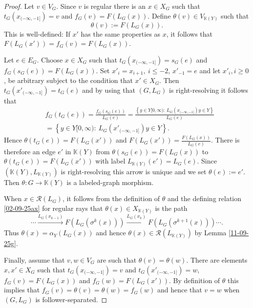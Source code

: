 \documentclass[10pt,a4paper]{amsart}
\begin{document}
\begin{proof} Let $v \in V_G$. Since $v$ is regular there is an $x \in X_G$ such that $t_G(x_{(-\infty,-1]}) = v$ and 
$f_G(v)  = F(L_G(x))$.
Define $\theta(v) \in V_{\mathbb K(Y)}$ such that 
$$
\theta(v) := F(L_G(x)) .
$$
This is well-defined: If $x'$ has the same properties as $x$, it follows that
$F(L_G(x')) = f_G(v) = F(L_G(x))$.


Let $e \in E_G$. Choose $x \in X_G$ such that $t_G(x_{(-\infty,-1]}) = s_G(e)$ and 
$f_G(s_G(e)) = F(L_G(x))$.
Set $x'_i = x_{i+1}, \ i \leq -2$, $x'_{-1} =e$ and let $x'_i, i \geq 0$, be arbitrary subject to the condition that $x' \in X_G$. Then $t_G(x'_{(-\infty, -1]}) = t_G(e)$ and by using that $(G,L_G)$ is right-resolving it follows that
\begin{align*}
& f_G(t_G(e)) = \frac{f_G(s_G(e))}{L_G(e)}
 = \frac{\left\{y \in Y[0,\infty): \ L_G(x_{(-\infty,-1]})y \in Y \right\}}{L_G(e)} \\
 &= \left\{y \in Y[0,\infty): \ L_G(x'_{(-\infty,-1]})y \in Y \right\}.
\end{align*}
Hence $\theta(t_G(e)) = F(L_G(x'))$ and  $F(L_G(x')) = \frac{F(L_G(x))}{L_G(e)}$. There is therefore an edge $e'$ in $\mathbb K(Y)$ from $\theta(s_G(e)) =F(L_G(x)) $ to $\theta(t_G(e)) = F(L_G(x'))$ with label $L_{\mathbb K(Y)}(e') =L_G(e)$. Since $(\mathbb K(Y), L_{\mathbb K(Y)})$ is right-resolving this arrow is unique and we set $\theta(e):= e'$. Then $\theta : G \to \mathbb K(Y)$ is a labeled-graph morphism.

When $x \in \mathcal R(L_G)$, it follows from the definition of $\theta$ and the defining relation \eqref{02-09-25ax} for regular rays that $\theta(x) \in X_{\mathbb K(Y)}$ is the path
$$
\cdots  \overset{L_G(x_{k-1})}{\to}F(L_G(\sigma^k(x))) \overset{L_G(x_k)}{\to} F(L_G(\sigma^{k+1}(x))) \cdots .
$$ 
Thus $\theta(x) = \alpha_Y(L_G(x))$ and hence $\theta(x) \in \mathcal R(L_{\mathbb K(Y)})$ by Lemma \ref{11-09-25g}. 







Finally, assume that $v,w \in V_G$ are such that $\theta(v) =\theta(w)$. There are elements $x,x' \in X_G$ such that $t_G(x_{(-\infty,-1]}) = v$ and $t_G(x'_{(-\infty,-1]}) = w$, $f_{G}(v) = F(L_G(x))$ and $f_G(w) = F(L_G(x'))$. By definition of $\theta$ this implies that $f_G(v) = \theta(v) = \theta(w) = f_G(w)$ and hence that $v=w$ when $(G,L_G)$ is follower-separated.
\end{proof}
\end{document}
